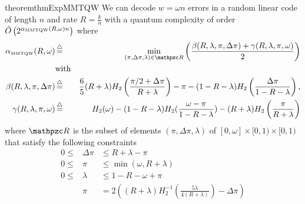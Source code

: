 \begin{restatable}{theorem}{thmExpMMTQW}
\label{th:expMMTQWdiese}
We can decode $w=\omega n$ errors in a random linear code of length $n$ and rate $R=\frac{k}{n}$  with a quantum complexity of 
order $ \tilde{O}\left( 2^{\alpha_{\text{MMTQW}}(R,\omega)n} \right)$ where
\begin{eqnarray*}
    \alpha_{\text{{\tiny{MMTQW}}}}(R,\omega) &\eqdef& \min_{(\pi,\Delta \pi, \lambda) \in \zR} \left( 
\frac{  \beta(R,\lambda,\pi,\Delta \pi)+ \gamma(R,\lambda,\pi,\omega)}{2}\right) \\
&\text{with} & \\
\beta(R,\lambda,\pi,\Delta \pi) & \eqdef & \frac{6}{5} (R+\lambda)H_2\left(\frac{\pi/2+\Delta \pi}{R+\lambda}\right)- \pi - (1-R-\lambda)H_2\left(\frac{\Delta \pi }{1-R-\lambda}\right),\\
\gamma(R,\lambda,\pi,\omega) & \eqdef & H_2(\omega) - (1-R-\lambda)H_2(\frac{\omega - \pi}{1-R-\lambda}) - (R+\lambda)H_2\left(\frac{\pi}{R+\lambda}\right)
\end{eqnarray*}
where $\zR$ is the subset of elements $(\pi,\Delta \pi, \lambda)$ of 
$[0,\omega]  \times [0,1) \times [0,1) $
 that satisfy the following constraints
\begin{eqnarray*}
0 \leq  &\Delta \pi  &\leq R + \lambda - \pi \\
0 \leq &\pi &\leq \min(\omega, R + \lambda)\\
0 \leq &\lambda &\leq 1 - R - \omega + \pi \\
&\pi &= 2\left((R+\lambda)H_2^{-1}\left(\frac{5\lambda}{4(R+\lambda)}\right) - \Delta \pi\right)
\end{eqnarray*}
\end{restatable}
